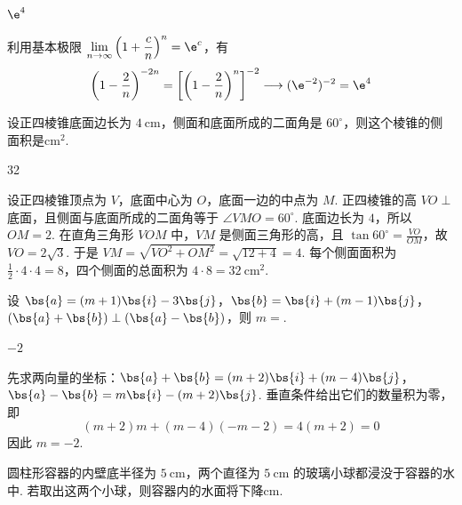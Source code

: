 \begin{answer}
\(\e^{4}\)
\end{answer}

\begin{solution}
利用基本极限 \(\displaystyle\lim_{n\to\infty}\left(1+\frac{c}{n}\right)^n=\e^c\)，有
\[
\left(1-\frac2n\right)^{-2n}=\left[\left(1-\frac2n\right)^n\right]^{-2}\longrightarrow(\e^{-2})^{-2}=\e^4
\]
\end{solution}

\begin{problem}[A]
设正四棱锥底面边长为 \(4 \mathrm{~cm}\)，侧面和底面所成的二面角是 \(60^{\circ}\)，则这个棱锥的侧面积是\fillinblank{}\(\mathrm{cm}^{2}\).
\end{problem}

\begin{answer}
32
\end{answer}

\begin{solution}
设正四棱锥顶点为 \(V\)，底面中心为 \(O\)，底面一边的中点为 \(M\). 正四棱锥的高 \(VO\perp\) 底面，且侧面与底面所成的二面角等于 \(\angle VMO=60^{\circ}\). 底面边长为 \(4\)，所以 \(OM=2\). 在直角三角形 \(VOM\) 中，\(VM\) 是侧面三角形的高，且 \(\tan60^{\circ}=\frac{VO}{OM}\)，故 \(VO=2\sqrt3\). 于是 \(VM=\sqrt{VO^2+OM^2}=\sqrt{12+4}=4\). 每个侧面面积为 \(\frac12\cdot4\cdot4=8\)，四个侧面的总面积为 \(4\cdot8=32\ \mathrm{cm}^2\).
\end{solution}

\reuseproblemnumber
\begin{problem}[B]
设 \(\bs{a}=(m+1)\bs{i}-3\bs{j}\)，\(\bs{b}=\bs{i}+(m-1)\bs{j}\)，\((\bs{a}+\bs{b})\perp(\bs{a}-\bs{b})\)，则 \(m=\)\fillinblank{}.
\end{problem}

\begin{answer}
\(-2\)
\end{answer}

\begin{solution}
先求两向量的坐标：\(\bs{a}+\bs{b}=(m+2)\bs{i}+(m-4)\bs{j}\)，\(\bs{a}-\bs{b}=m\bs{i}-(m+2)\bs{j}\). 垂直条件给出它们的数量积为零，即
\[
(m+2)m+(m-4)(-m-2)=4(m+2)=0
\]
因此 \(m=-2\).
\end{solution}

\begin{problem}[A]
圆柱形容器的内壁底半径为 \(5 \mathrm{~cm}\)，两个直径为 \(5 \mathrm{~cm}\) 的玻璃小球都浸没于容器的水中. 若取出这两个小球，则容器内的水面将下降\fillinblank{}\(\mathrm{cm}\).
\end{problem}

